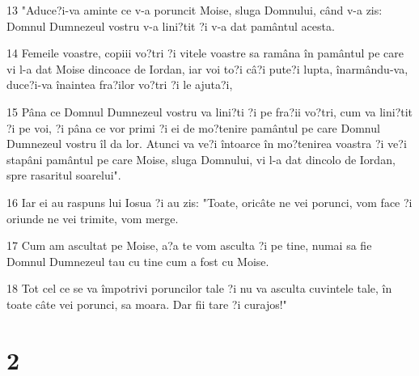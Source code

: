 \par 13 "Aduce?i-va aminte ce v-a poruncit Moise, sluga Domnului, când v-a zis: Domnul Dumnezeul vostru v-a lini?tit ?i v-a dat pamântul acesta.
\par 14 Femeile voastre, copiii vo?tri ?i vitele voastre sa ramâna în pamântul pe care vi l-a dat Moise dincoace de Iordan, iar voi to?i câ?i pute?i lupta, înarmându-va, duce?i-va înaintea fra?ilor vo?tri ?i le ajuta?i,
\par 15 Pâna ce Domnul Dumnezeul vostru va lini?ti ?i pe fra?ii vo?tri, cum va lini?tit ?i pe voi, ?i pâna ce vor primi ?i ei de mo?tenire pamântul pe care Domnul Dumnezeul vostru îl da lor. Atunci va ve?i întoarce în mo?tenirea voastra ?i ve?i stapâni pamântul pe care Moise, sluga Domnului, vi l-a dat dincolo de Iordan, spre rasaritul soarelui".
\par 16 Iar ei au raspuns lui Iosua ?i au zis: "Toate, oricâte ne vei porunci, vom face ?i oriunde ne vei trimite, vom merge.
\par 17 Cum am ascultat pe Moise, a?a te vom asculta ?i pe tine, numai sa fie Domnul Dumnezeul tau cu tine cum a fost cu Moise.
\par 18 Tot cel ce se va împotrivi poruncilor tale ?i nu va asculta cuvintele tale, în toate câte vei porunci, sa moara. Dar fii tare ?i curajos!"

\chapter{2}

